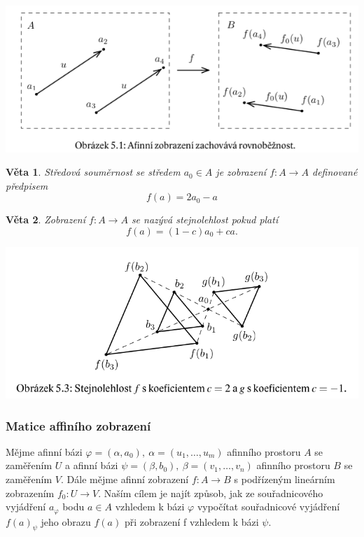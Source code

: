 \documentclass[12pt,a4paper]{article}
\newtheorem{sentence}{Věta}
\begin{document}
\begin{center}
	\includegraphics[scale=0.7]{img/AfinniZobrazeni}
\end{center}

\begin{sentence}
	Středová souměrnost se středem $a_0 \in A$ je zobrazení $f : A \rightarrow A$ definované předpisem $$f(a) = 2a_0 - a$$ 
\end{sentence}
\begin{sentence}
	Zobrazení $f : A \rightarrow A$ se nazývá stejnolehlost pokud platí $$f(a) = (1 - c)a_0 + ca.$$
\end{sentence}

\begin{center}
	\includegraphics[scale=0.6]{img/Stejnolehlost}
\end{center}


\subsubsection{Matice affiního zobrazení}
Mějme afinní bázi $\varphi = (\alpha, a_0),\ \alpha = (u_1, \dots, u_m)$ afinního prostoru $A$ se zaměřením $U$ a afinní bázi $\psi = (\beta, b_0),\ \beta = (v_1, \dots, v_n)$ afinního prostoru $B$ se zaměřením $V$. Dále mějme afinní zobrazení $f : A \rightarrow B$ s podřízeným lineárním zobrazením $f_0 : U \rightarrow V$. Naším cílem je najít způsob, jak ze souřadnicového vyjádření $a_\varphi$ bodu $a \in A$ vzhledem k bázi $\varphi$ vypočítat souřadnicové vyjádření $f(a)_\psi$ jeho obrazu $f(a)$ při zobrazení f vzhledem k bázi $\psi$.
\end{document}
